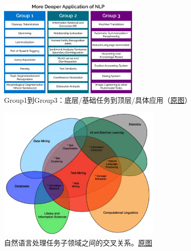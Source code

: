 \documentclass[lang=cn,11pt,a4paper]{eleganttemplate}
\begin{document}
\begin{figure}[htbp]
  \centering
  \vspace{-1cm}
  \includegraphics[width=0.6\textwidth]{image/nlp_3.png}
  \caption{Group1到Group3：底层/基础任务到顶层/具体应用（\href{https://www.packtpub.com/product/python-natural-language-processing/9781787121423}{原图}）}
\end{figure}

\begin{figure}[htbp]
  \centering
  \includegraphics[width=0.7\textwidth]{image/nlp_4.png}
  \caption{自然语言处理任务子领域之间的交叉关系。\href{https://bbds.ma/wp-content/uploads/2017/11/BBDS-Deep-Learning-NLP-Text-Mining-2.pdf}{原图}}
\end{figure}
\end{document}
